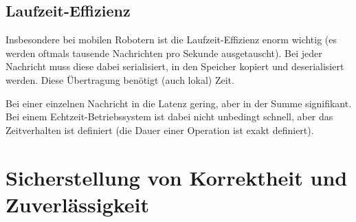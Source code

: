 		\subsection{Laufzeit-Effizienz}
			Insbesondere bei mobilen Robotern ist die Laufzeit-Effizienz enorm wichtig (es werden oftmals tausende Nachrichten pro Sekunde ausgetauscht). Bei jeder Nachricht muss diese dabei serialisiert, in den Speicher kopiert und deserialisiert werden. Diese Übertragung benötigt (auch lokal) Zeit.
			
			Bei einer einzelnen Nachricht in die Latenz gering, aber in der Summe signifikant. Bei einem Echtzeit-Betriebssystem ist dabei nicht unbedingt schnell, aber das Zeitverhalten ist definiert (\dh die Dauer einer Operation ist exakt definiert).

	\section{Sicherstellung von Korrektheit und Zuverlässigkeit}
